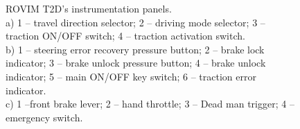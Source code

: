 \documentclass[journal]{IEEEtran}
\begin{document}
\begin{figure}[!t]%
    \centering
        \hfill
        \hfill
        \caption[]{ROVIM T2D's instrumentation panels.\\\hspace{\textwidth}a) 1 -- travel direction selector; 2 -- driving mode selector; 3 -- traction ON/OFF switch; 4 -- traction activation switch.\\\hspace{\textwidth}b) 1 -- steering error recovery pressure button; 2 -- brake lock indicator; 3 -- brake unlock pressure button; 4 -- brake unlock indicator; 5 -- main ON/OFF key switch; 6 -- traction error indicator.\\\hspace{\textwidth}c) 1 --front brake lever; 2 -- hand throttle; 3 -- Dead man trigger; 4 --emergency switch.}
        \label{fig:controlos}
\end{figure}
\end{document}
